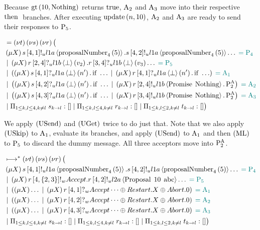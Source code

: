 Because $\greaterThan{10}{\Nothing}$ returns $\True$, $\Acceptor{2}$ and $\Acceptor{3}$ move into their respective $\Then$ branches.
After executing $\update{n}{10}$, $\Acceptor{2}$ and $\Acceptor{3}$ are ready to send their responses to $\Proposer{5}$.

\begin{align*}
&= \NuChannels \big (\\
&\Mu{X} \SendUnreliableP{s}{4}{1}{\LOneA}{\proposalNumber{5}{4}}.\SendUnreliableP{s}{4}{2}{\LOneA}{\proposalNumber{5}{4}}\dots \comment{= \Proposer{4}}\\
&\Or \Mu{X} \ReceiveUnreliableP{r}{2}{4}{\LOneB}{\bot}{v_2}.\ReceiveUnreliableP{r}{3}{4}{\LOneB}{\bot}{v_3}\dots \comment{= \Proposer{5}}\\
&\Or \Paren{
    \Mu{X} \ReceiveUnreliableP{s}{4}{1}{\LOneA}{\bot}{n'}.\If{\dots}
    \Or \Mu{X} \ReceiveUnreliableP{r}{4}{1}{\LOneA}{\bot}{n'}.\If{\dots}
} \comment{= \Acceptor{1}}\\
&\Or \Paren{
    \Mu{X} \ReceiveUnreliableP{s}{4}{2}{\LOneA}{\bot}{n'}.\If{\dots}
    \Or \Mu{X} \SendUnreliableP{r}{2}{4}{\LOneB}{\Promise{\Nothing}}.\PaTwo
} \comment{= \Acceptor{2}}\\
&\Or \Paren{
    \Mu{X} \ReceiveUnreliableP{s}{4}{3}{\LOneA}{\bot}{n'}.\If{\dots}
    \Or \Mu{X} \SendUnreliableP{r}{3}{4}{\LOneB}{\Promise{\Nothing}}.\PaTwo
} \comment{= \Acceptor{3}}\\
&\Or \InnerSessionQueues{s}
\Or \InnerSessionQueues{r}
\Or \OuterSessionQueues
\big )
\end{align*}

We apply $\RUsend$ and $\RUget$ twice to do just that.
Note that we also apply $\RUskip$ to $\Acceptor{1}$, evaluate its branches, and apply $\RUsend$ to $\Acceptor{1}$ and then $\Rml$ to $\Proposer{5}$ to discard the dummy message.
All three acceptors move into $\PaTwo$.

\begin{align*}
&\mapstostar \NuChannels \big (\\
&\Mu{X} \SendUnreliableP{s}{4}{1}{\LOneA}{\proposalNumber{5}{4}}.\SendUnreliableP{s}{4}{2}{\LOneA}{\proposalNumber{5}{4}}\dots \comment{= \Proposer{4}}\\
&\Or \Mu{X} \SendWeaklyP{r}{4}{\Curly{2,3}}{\Accept}{\SendUnreliableP{r}{4}{2}{\LTwoA}{\ProposalC{10}{\ABC}}}\dots \comment{= \Proposer{5}}\\
&\Or \Paren{
    \Mu{X} \dots
    \Or \Mu{X} \ReceiveWeaklyP{r}{4}{1}{\BeginPaCont}
} \comment{= \Acceptor{1}}\\
&\Or \Paren{
    \Mu{X} \dots
    \Or \Mu{X} \ReceiveWeaklyP{r}{4}{2}{\BeginPaCont}
} \comment{= \Acceptor{2}}\\
&\Or \Paren{
    \Mu{X} \dots
    \Or \Mu{X} \ReceiveWeaklyP{r}{4}{3}{\BeginPaCont}
} \comment{= \Acceptor{3}}\\
&\Or \InnerSessionQueues{s}
\Or \InnerSessionQueues{r}
\Or \OuterSessionQueues
\big )
\end{align*}

